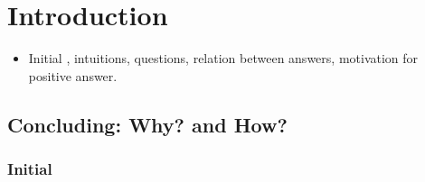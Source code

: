 \chapter{Introduction}
\label{cha:introduction}

\begin{note}
  \begin{itemize}
  \item
    Initial , intuitions, questions, relation between answers, motivation for positive answer.
  \end{itemize}
\end{note}

\section{Concluding: Why? and How?}
\label{sec:overview:issue}

\subsection{Initial }

